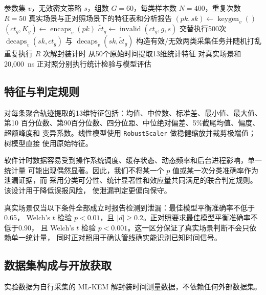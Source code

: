 \documentclass[a4paper,fontset=none]{ctexart}
\begin{document}
\begin{algorithm}[H]
  \caption{ML-KEM 解封装时间采集流程}
  \label{alg:collect}
  \begin{algorithmic}[1]
    \Require 参数集 $v$，无效密文策略 $s$，组数 $G=60$，每类样本数 $N=400$，重复次数 $R=50$
    \Ensure 真实场景与正对照场景下的特征表和分析报告
    \State $(pk,sk)\leftarrow \operatorname{keygen}_v()$
      \State $(ct_g, K_g)\leftarrow \operatorname{encaps}_v(pk)$
      \State $\widetilde{ct}_g\leftarrow \operatorname{invalid}(ct_g,g,s)$
    \EndFor
    \State 交替执行500次 $\operatorname{decaps}_v(sk,ct_g)$ 与 $\operatorname{decaps}_v(sk,\widetilde{ct}_g)$
    \State 构造有效/无效两类采集任务并随机打乱
      \State 重复执行 $R$ 次解封装计时
      \State 从50个原始时间提取13维统计特征
    \EndFor
    \State 对真实场景和20,000~ns 正对照分别执行统计检验与模型评估
  \end{algorithmic}
\end{algorithm}

\subsection{特征与判定规则}

对每条聚合轨迹提取的13维特征包括：均值、中位数、标准差、最小值、最大值、第10
百分位数、第90百分位数、四分位距、中位绝对偏差、5\%截尾均值、偏度、超额峰度和
变异系数。线性模型使用 \texttt{RobustScaler} 做稳健缩放并裁剪极端值；树模型直接
使用原始特征。

软件计时数据容易受到操作系统调度、缓存状态、动态频率和后台进程影响，单一统计量
可能出现偶然显著。因此，我们不将某一个 $p$ 值或某一次分类准确率作为泄漏证据，而
采用分类可分性、统计显著性和效应量共同满足的联合判定规则。该设计用于降低误报风险，
使泄漏判定更偏向保守。

真实场景仅当以下条件全部成立时报告检测到泄漏：最佳模型平衡准确率不低于0.65，
Welch's $t$ 检验 $p<0.01$，且 $|d|\ge 0.2$。正对照要求最佳模型平衡准确率不低于0.90，
且 Welch's $t$ 检验 $p<0.001$。这一区分保证了真实场景判断不会只依赖单一统计量，
同时正对照用于确认管线确实能识别已知时间信号。

\subsection{数据集构成与开放获取}
\label{sec:dataset}

实验数据为自行采集的 ML-KEM 解封装时间测量数据，不依赖任何外部数据集。
\end{document}

